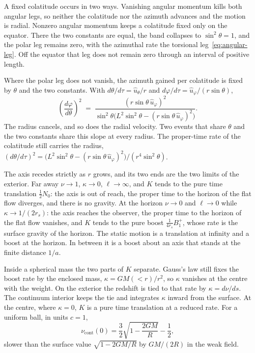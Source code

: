 \documentclass[a4paper]{article}
\begin{document}
A fixed colatitude occurs in two ways. Vanishing angular momentum kills both angular legs, so neither the colatitude nor the azimuth advances and the motion is radial. Nonzero angular momentum keeps a colatitude fixed only on the equator. There the two constants are equal, the band collapses to \(\sin^{2}\theta=1\), and the polar leg remains zero, with the azimuthal rate the torsional leg~\eqref{eq:angular-leg}. Off the equator that leg does not remain zero through an interval of positive length.

Where the polar leg does not vanish, the azimuth gained per colatitude is fixed by \(\theta\) and the two constants. With \(d\theta/d\tau=\hat{u}_{\theta}/r\) and \(d\varphi/d\tau=\hat{u}_{\varphi}/(r\sin\theta)\),
\begin{equation}
\left(\frac{d\varphi}{d\theta}\right)^{2}
\;=\;
\frac{(r\sin\theta\,\hat{u}_{\varphi})^{2}}{\sin^{2}\theta\bigl(L^{2}\sin^{2}\theta-(r\sin\theta\,\hat{u}_{\varphi})^{2}\bigr)}.
\label{eq:azimuth-slope}
\end{equation}
The radius cancels, and so does the radial velocity. Two events that share \(\theta\) and the two constants share this slope at every radius. The proper-time rate of the colatitude still carries the radius, \((d\theta/d\tau)^{2}=\bigl(L^{2}\sin^{2}\theta-(r\sin\theta\,\hat{u}_{\varphi})^{2}\bigr)/(r^{4}\sin^{2}\theta)\).

The axis recedes strictly as \(r\) grows, and its two ends are the two limits of the exterior. Far away \(\nu\to 1\), \(\kappa\to 0\), \(\ell\to\infty\), and \(K\) tends to the pure time translation \(\tfrac12 N_{0}\): the axis is out of reach, the proper time to the horizon of the flat flow diverges, and there is no gravity. At the horizon \(\nu\to 0\) and \(\ell\to 0\) while \(\kappa\to 1/(2r_{s})\): the axis reaches the observer, the proper time to the horizon of the flat flow vanishes, and \(K\) tends to the pure boost \(\tfrac{1}{4r_{s}}B^{+}_{1}\), whose rate is the surface gravity of the horizon. The static motion is a translation at infinity and a boost at the horizon. In between it is a boost about an axis that stands at the finite distance \(1/a\).

Inside a spherical mass the two parts of \(K\) separate. Gauss's law still fixes the boost rate by the enclosed mass, \(\kappa=GM(<r)/r^{2}\), so \(\kappa\) vanishes at the centre with the weight. On the exterior the redshift is tied to that rate by \(\kappa=d\nu/ds\). The continuum interior keeps the tie and integrates \(\kappa\) inward from the surface. At the centre, where \(\kappa=0\), \(K\) is a pure time translation at a reduced rate. For a uniform ball, in units \(c=1\),
\[
\nu_{\mathrm{cont}}(0)
=\frac32\sqrt{1-\frac{2GM}{R}}-\frac12,
\]
slower than the surface value \(\sqrt{1-2GM/R}\) by \(GM/(2R)\) in the weak field.
\end{document}
